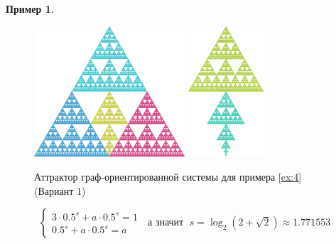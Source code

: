 \documentclass[a4paper,14pt]{extarticle} %
\newcommand{\0}{\varnothing}
\newcommand{\8}{\infty}
\theoremstyle{definition}
\newtheorem{example}{Пример}
\begin{document}
\begin{example}
\begin{figure}[H]
    \centering
    \includegraphics[width=0.5\textwidth]{e4a.png}
    \hfill
    \includegraphics[width=0.25\textwidth]{e4b.png}
    \begin{minipage}{0.85\textwidth}
        \caption{Аттрактор граф-ориентированной системы для примера \ref{ex:4} (Вариант 1)}
        \label{fig:ex4gds1}   
    \end{minipage}
\end{figure}
$$
\begin{cases}
   3\cdot0.5^s + a\cdot0.5^s = 1\\
   0.5^s + a\cdot0.5^s= a
\end{cases}
\;\text{ а значит }\;s=\log_{2}(2+\sqrt2)\approx1.771553
$$



\end{example}
\end{document}
